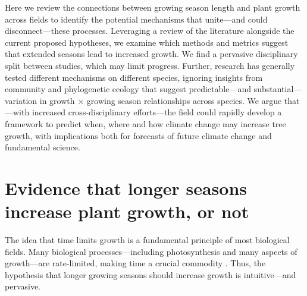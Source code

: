 \documentclass[11pt]{article}
\begin{document}
Here we review the connections between growing season length and plant growth across fields to identify the potential mechanisms that unite---and could disconnect---these processes. %
Leveraging a review of the literature alongside the current proposed hypotheses, we examine which methods and metrics suggest that extended seasons lead to increased growth. We find a pervasive disciplinary split between studies, which may limit progress. Further, research has generally tested different mechanisms on different species, ignoring insights from community and phylogenetic ecology \citep[e.g.,][]{Grime:1977sw,Ackerly:2009ly,avila2023evidence} that suggest predictable---and substantial---variation in growth $\times$ growing season relationships across species. We argue that---with increased cross-disciplinary efforts---the field could rapidly develop a framework to predict when, where and how climate change may increase tree growth, with implications both for forecasts of future climate change and fundamental science.

\section*{Evidence that longer seasons increase plant growth, or not}
The idea that time limits growth is a fundamental principle of most biological fields. Many biological processes---including photosynthesis and many aspects of growth---are rate-limited, making time a crucial commodity \citep{nobel1983biophysical,cosgrove2005growth,hilty2021plant}. Thus, the hypothesis that longer growing seasons should increase growth is intuitive---and pervasive. 
\end{document}
